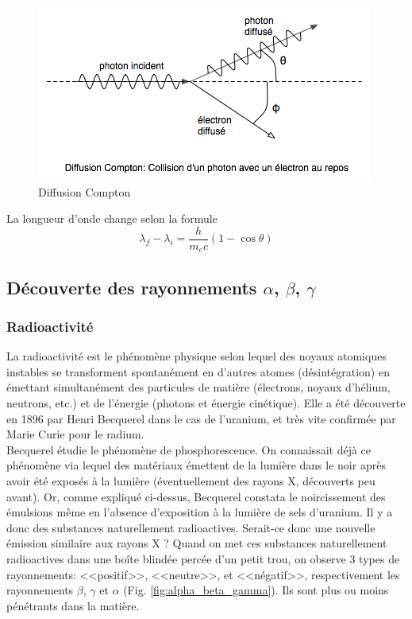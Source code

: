 \begin{figure}[ht]
    \centering
    \includegraphics[scale=0.60]{Images1/compton.png}
    \caption{Diffusion Compton}
\end{figure}

La longueur d'onde change selon la formule
\[
    \lambda_f-\lambda_i=\dfrac{h}{m_ec}(1-\cos{\theta})
\]

\subsection{Découverte des rayonnements $\alpha$, $\beta$, $\gamma$}
\subsubsection{Radioactivité}
La radioactivité est le phénomène physique selon lequel des noyaux atomiques instables se transforment spontanément en d'autres atomes (désintégration) en émettant simultanément des particules de matière (électrons, noyaux d'hélium, neutrons, etc.) et de l'énergie (photons et énergie cinétique). Elle a été découverte en 1896 par Henri Becquerel dans le cas de l'uranium, et très vite confirmée par Marie Curie pour le radium. \\

Becquerel étudie le phénomène de phosphorescence. On connaissait déjà ce phénomène via lequel des matériaux émettent de la lumière dans le noir après avoir été exposés à la lumière (éventuellement des rayons X, découverts peu avant). Or, comme expliqué ci-dessus, Becquerel constata le noircissement des émulsions même en l'absence d'exposition à la lumière de sels d'uranium. Il y a donc des substances naturellement radioactives. Serait-ce donc une nouvelle émission similaire aux rayons X ? Quand on met ces substances naturellement radioactives dans une boîte blindée percée d'un petit trou, on observe 3 types de rayonnements: <<positif>>, <<neutre>>, et <<négatif>>, respectivement les rayonnements $\beta$, $\gamma$ et $\alpha$ (Fig. \ref{fig:alpha_beta_gamma}). Ils sont plus ou moins pénétrants dans la matière.

